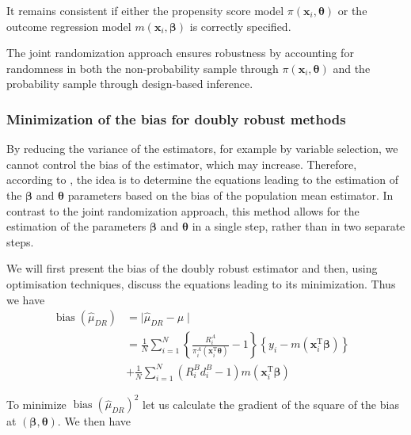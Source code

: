 \documentclass[
]{jss}
\begin{document}
It remains consistent if either the propensity score model
\(\pi(\boldsymbol{x}_i, \boldsymbol{\theta})\) or the outcome regression
model \(m(\boldsymbol{x}_i, \boldsymbol{\beta})\) is correctly
specified.

The joint randomization approach ensures robustness by accounting for
randomness in both the non-probability sample through
\(\pi(\boldsymbol{x}_i, \boldsymbol{\theta})\) and the probability
sample through design-based inference.

\subsubsection{Minimization of the bias for doubly robust
methods}\label{minimization-of-the-bias-for-doubly-robust-methods}

By reducing the variance of the estimators, for example by variable
selection, we cannot control the bias of the estimator, which may
increase. Therefore, according to \citet{yang_doubly_2020}, the idea is
to determine the equations leading to the estimation of the
\(\boldsymbol{\beta}\) and \(\boldsymbol{\theta}\) parameters based on
the bias of the population mean estimator. In contrast to the joint
randomization approach, this method allows for the estimation of the
parameters \(\boldsymbol{\beta}\) and \(\boldsymbol{\theta}\) in a
single step, rather than in two separate steps.

We will first present the bias of the doubly robust estimator and then,
using optimisation techniques, discuss the equations leading to its
minimization. Thus we have \begin{equation}
\begin{aligned}
\operatorname{bias}\left(\hat{\mu}_{D R}\right) & = \mid\hat{\mu}_{DR}-\mu\mid& \\
& =\frac{1}{N} \sum_{i=1}^N\left\{\frac{R_i^A}{\pi_i^A\left(\boldsymbol{x}_i^{\mathrm{T}} \boldsymbol{\theta}\right)}-1\right\}\left\{y_i-m\left(\boldsymbol{x}_i^{\mathrm{T}} \boldsymbol{\beta}\right)\right\}\\
& + \frac{1}{N} \sum_{i=1}^N\left(R_i^B d_i^B-1\right) m\left(\boldsymbol{x}_i^{\mathrm{T}} \boldsymbol{\beta}\right)
\end{aligned}
\end{equation}

To minimize \(\operatorname{bias}\left(\hat{\mu}_{D R}\right)^2\) let us
calculate the gradient of the square of the bias at
\(\left(\boldsymbol{\beta}, \boldsymbol{\theta}\right)\). We then have
\end{document}
